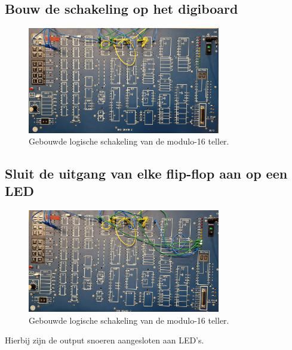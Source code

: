 \documentclass[12pt]{article}
\begin{document}
\subsection{Bouw de schakeling op het digiboard}
\begin{figure}[h]
    \centering
    \includegraphics[width=0.75\textwidth]{16LOS.jpg}
    \caption{Gebouwde logische schakeling van de modulo-16 teller.}
    \label{fig:16modg}
\end{figure}
\subsection{Sluit de uitgang van elke flip-flop aan op een LED}
\begin{figure}[h]
    \centering
    \includegraphics[width=0.75\textwidth]{16LED2.jpg}
    \caption{Gebouwde logische schakeling van de modulo-16 teller.}
    \label{fig:16modgl}
\end{figure}
Hierbij zijn de output snoeren aangesloten aan LED's.
\pagebreak
\end{document}
